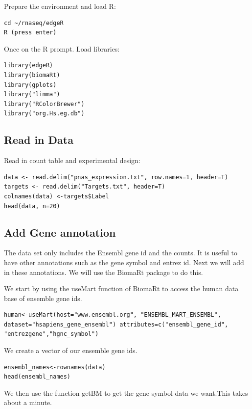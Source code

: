 \begin{steps}
Prepare the environment and load R:
\begin{lstlisting}
cd ~/rnaseq/edgeR
R (press enter)
\end{lstlisting}

Once on the R prompt. Load libraries:
\begin{lstlisting}
library(edgeR)
library(biomaRt)
library(gplots)
library("limma")
library("RColorBrewer")
library("org.Hs.eg.db")
\end{lstlisting}

\subsection{Read in Data}
Read in count table and experimental design:

\begin{steps}
\begin{lstlisting}
data <- read.delim("pnas_expression.txt", row.names=1, header=T)
targets <- read.delim("Targets.txt", header=T)
colnames(data) <-targets$Label
head(data, n=20)
\end{lstlisting}
\end{steps}
\subsection {Add Gene annotation}

The data set only includes the Ensembl gene id and the counts. It is useful to have other annotations such as the gene symbol and entrez id. Next we will add in these annotations.  We will use the BiomaRt package to do this.


\begin{steps}
We start by using the useMart function of BiomaRt to access the human data base of ensemble gene ids.  

\begin{lstlisting}
human<-useMart(host="www.ensembl.org", "ENSEMBL_MART_ENSEMBL", dataset="hsapiens_gene_ensembl") attributes=c("ensembl_gene_id", "entrezgene","hgnc_symbol")
\end{lstlisting}

We create a vector of our ensemble gene ids.
\begin{lstlisting}
ensembl_names<-rownames(data)
head(ensembl_names)
\end{lstlisting}
We then use the function getBM to get the gene symbol data we want.This takes about a minute.


\end{steps}
\end{steps}
